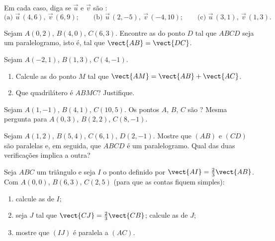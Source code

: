 \begin{exercise}[$\star$]\label{exo:g10:vectors:4}
Em cada caso, diga se $\vec u$ e $\vec v$ são :
\[
\text{(a) } \vec u\,(4, 6),\ \vec v\,(6, 9);
\qquad
\text{(b) } \vec u\,(2, -5),\ \vec v\,(-4, 10);
\qquad
\text{(c) } \vec u\,(3, 1),\ \vec v\,(1, 3).
\]
\end{exercise}

\begin{exercise}[$\star$]\label{exo:g10:vectors:5}
Sejam $A(0, 2)$, $B(4, 0)$, $C(6, 3)$. Encontre as  do ponto
$D$ tal que $ABCD$ seja um paralelogramo, isto é, tal que
$\vect{AB} = \vect{DC}$.
\end{exercise}

\begin{exercise}[$\star\star$]\label{exo:g10:vectors:6}
Sejam $A(-2, 1)$, $B(1, 3)$, $C(4, -1)$.
\begin{enumerate}
  \item Calcule as  do ponto $M$ tal que
        $\vect{AM} = \vect{AB} + \vect{AC}$.
  \item Que quadrilátero é $ABMC$? Justifique.
\end{enumerate}
\end{exercise}

\begin{exercise}[$\star\star$]\label{exo:g10:vectors:7}
Sejam $A(1, -1)$, $B(4, 1)$, $C(10, 5)$. Os pontos $A$, $B$, $C$ são
? Mesma pergunta para $A(0, 3)$, $B(2, 2)$, $C(8, -1)$.
\end{exercise}

\begin{exercise}[$\star\star$]\label{exo:g10:vectors:8}
Sejam $A(1, 2)$, $B(5, 4)$, $C(6, 1)$, $D(2, -1)$. Mostre que $(AB)$ e
$(CD)$ são paralelas e, em seguida, que $ABCD$ é um paralelogramo. Qual
das duas verificações implica a outra?
\end{exercise}

\begin{exercise}[$\star\star$]\label{exo:g10:vectors:9}
Seja $ABC$ um triângulo e seja $I$ o ponto definido por
$\vect{AI} = \frac23 \vect{AB}$. Com $A(0,0)$, $B(6, 3)$, $C(2, 5)$
(para que as contas fiquem simples):
\begin{enumerate}
  \item calcule as  de $I$;
  \item seja $J$ tal que $\vect{CJ} = \frac23\vect{CB}$; calcule as
         de $J$;
  \item mostre que $(IJ)$ é paralela a $(AC)$.
\end{enumerate}
\end{exercise}

